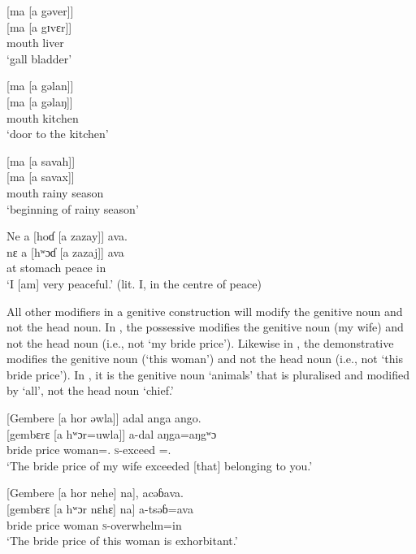 \ea \label{ex:5:78}
{}[ma  [a  gəver]]\\
\gll  {}[ma   [a  gɪvɛr]]\\
      mouth  {\GEN}  liver\\
\glt  ‘gall bladder’
\z

\ea \label{ex:5:79}
{}[ma  [a  gəlan]]\\
\gll  {}[ma   [a  gəlaŋ]]\\
      mouth  {\GEN}  kitchen\\
\glt  ‘door to the kitchen’
\z

\ea \label{ex:5:80}
{}[ma  [a  savah]]\\
\gll  {}[ma   [a  savax]]\\
      mouth  {\GEN}  {rainy season}\\
\glt  ‘beginning of rainy season’
\z

\ea \label{ex:5:81}
Ne  a  [hoɗ  [a  zazay]]  ava.\\
\gll  nɛ  a   [hʷɔɗ  [a   zazaj]]   ava\\
      {\oneS}  at  stomach  {\GEN}  peace  in\\
\glt  ‘I [am] very peaceful.’ (lit. I, in the centre of peace)
\z

All other modifiers in a genitive construction will modify the genitive noun and not the head noun. In , the possessive modifies the genitive noun (my wife) and not the head noun (i.e., not ‘my bride price’). Likewise in , the demonstrative modifies the genitive noun (‘this woman’) and not the head noun (i.e., not ‘this bride price’). In , it is the genitive noun ‘animals’ that is pluralised and modified by ‘all’, not the head noun ‘chief.’

\ea \label{ex:5:82}
{}[Gembere  [a  hor  əwla]]  adal  anga  ango.\\
\gll  {}[gembɛrɛ  [a  hʷɔr=uwla]]    a-dal    aŋga=aŋgʷɔ\\
      {bride price}  {\GEN}  woman={\oneS}.{\POSS}  \textsc{s}-exceed  {\POSS}={\twoS}.{\POSS}\\
\glt  ‘The bride price of my wife exceeded [that] belonging to you.’
\z

\ea \label{ex:5:83}
{}[Gembere  [a  hor  nehe]  na],  acəɓava.\\
\gll  {}[gembɛrɛ  [a  hʷɔr  nɛhɛ]  na]  a-tsəɓ=ava\\
      {bride price}  {\GEN}  woman  {\DEM}  {\PSP}  \textsc{s}-overwhelm=in\\
\glt  ‘The bride price of this woman is exhorbitant.’ 
\z

